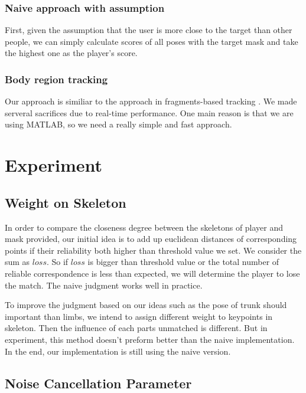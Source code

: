 \documentclass[11pt,twocolumn,letterpaper]{article}
\begin{document}
\subsubsection {Naive approach with assumption}
\par
First, given the assumption that the user is more close to the target than other people, we can simply calculate scores of all poses with the target mask and take the highest one as the player's score.
\subsubsection{Body region tracking}
Our approach is similiar to the approach in fragments-based tracking  \cite{1640835}. We made serveral sacrifices due to real-time performance. One main reason is that we are using MATLAB, so we need a really simple and fast approach.
\section{Experiment}
	\subsection{Weight on Skeleton}
      \par In order to compare the closeness degree between the skeletons of player and mask provided, our initial idea is to add up euclidean distances of corresponding points if their reliability both higher than threshold value we set. We consider the sum as $loss$. So if $loss$ is bigger than threshold value or the total number of reliable correspondence is less than expected, we will determine the player to lose the match. The naive judgment works well in practice.
      \par To improve the judgment based on our ideas such as the pose of trunk should important than limbs, we intend to assign different weight to keypoints in skeleton. Then the influence of each parts unmatched is different. But in experiment, this method doesn't preform better than the naive implementation. In the end, our implementation is still using the naive version.
  \subsection{Noise Cancellation Parameter}
\end{document}
